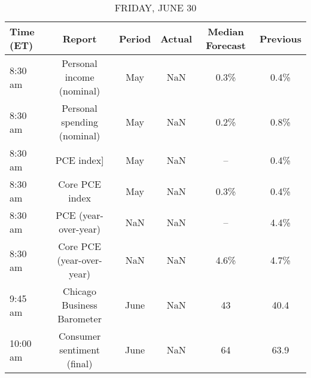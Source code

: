 \documentclass{article}%
\begin{document}
\begin{table}[htbp]%
\caption{FRIDAY, JUNE 30}%
\centering%
\begin{adjustbox}{width=1\textwidth}%
\begin{tabular}{lccccc}
\toprule
Time (ET) &                      Report & Period & Actual & Median Forecast & Previous \\
\midrule
  8:30 am &   Personal income (nominal) &    May &    NaN &            0.3\% &     0.4\% \\
  8:30 am & Personal spending (nominal) &    May &    NaN &            0.2\% &     0.8\% \\
  8:30 am &                  PCE index] &    May &    NaN &              -- &     0.4\% \\
  8:30 am &              Core PCE index &    May &    NaN &            0.3\% &     0.4\% \\
  8:30 am &        PCE (year-over-year) &    NaN &    NaN &              -- &     4.4\% \\
  8:30 am &   Core PCE (year-over-year) &    NaN &    NaN &            4.6\% &     4.7\% \\
  9:45 am &  Chicago Business Barometer &   June &    NaN &              43 &     40.4 \\
 10:00 am &  Consumer sentiment (final) &   June &    NaN &              64 &     63.9 \\
\bottomrule
\end{tabular}
%
\end{adjustbox}%
\end{table}
\end{document}
